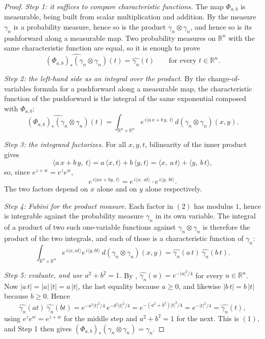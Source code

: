 \begin{proof}
\emph{Step 1: it suffices to compare characteristic functions.}
The map $\Phi_{a,b}$ is measurable, being built from scalar multiplication and
addition.  By  the measure $\gamma_n$ is a probability
measure, hence so is the product $\gamma_n \otimes \gamma_n$, and hence so is its
pushforward along a measurable map.  Two probability measures on $\mathbb{R}^n$
with the same characteristic function are equal, so it is enough to prove
\begin{equation*}
  \widehat{(\Phi_{a,b})_*(\gamma_n \otimes \gamma_n)}(t)
    = \widehat{\gamma_n}(t)
  \qquad\text{for every } t \in \mathbb{R}^n . \tag{1}
\end{equation*}

\emph{Step 2: the left-hand side as an integral over the product.}
By the change-of-variables formula for a pushforward along a measurable map, the
characteristic function of the pushforward is the integral of the same exponential
composed with $\Phi_{a,b}$:
\[
  \widehat{(\Phi_{a,b})_*(\gamma_n \otimes \gamma_n)}(t)
    = \int_{\mathbb{R}^n \times \mathbb{R}^n}
        e^{\,i \langle a\,x + b\,y,\ t\rangle}
      \, d(\gamma_n \otimes \gamma_n)(x,y) .
\]

\emph{Step 3: the integrand factorizes.}
For all $x, y, t$, bilinearity of the inner product gives
\[
  \langle a\,x + b\,y,\ t\rangle
    = a\,\langle x, t\rangle + b\,\langle y, t\rangle
    = \langle x,\ a\,t\rangle + \langle y,\ b\,t\rangle ,
\]
so, since $e^{z+w} = e^z e^w$,
\begin{equation*}
  e^{\,i\langle a x + b y,\ t\rangle}
    = e^{\,i\langle x,\ a t\rangle} \cdot e^{\,i\langle y,\ b t\rangle} . \tag{2}
\end{equation*}
The two factors depend on $x$ alone and on $y$ alone respectively.

\emph{Step 4: Fubini for the product measure.}
Each factor in $(2)$ has modulus $1$, hence is integrable against the probability
measure $\gamma_n$ in its own variable.  The integral of a product of two such
one-variable functions against $\gamma_n \otimes \gamma_n$ is therefore the
product of the two integrals, and each of those is a characteristic function of
$\gamma_n$:
\[
  \int_{\mathbb{R}^n\times\mathbb{R}^n} e^{\,i\langle x, a t\rangle}
      e^{\,i\langle y, b t\rangle} \, d(\gamma_n\otimes\gamma_n)(x,y)
  = \widehat{\gamma_n}(a\,t)\ \widehat{\gamma_n}(b\,t) .
\]

\emph{Step 5: evaluate, and use $a^2 + b^2 = 1$.}
By , $\widehat{\gamma_n}(u) = e^{-|u|^2/4}$ for every
$u \in \mathbb{R}^n$.  Now $|a\,t| = |a|\,|t| = a\,|t|$, the last equality because
$a \geq 0$, and likewise $|b\,t| = b\,|t|$ because $b \geq 0$.  Hence
\[
  \widehat{\gamma_n}(a t)\ \widehat{\gamma_n}(b t)
    = e^{-a^2|t|^2/4}\, e^{-b^2|t|^2/4}
    = e^{-(a^2+b^2)|t|^2/4}
    = e^{-|t|^2/4}
    = \widehat{\gamma_n}(t),
\]
using $e^{z}e^{w} = e^{z+w}$ for the middle step and $a^2 + b^2 = 1$ for the next.
This is $(1)$, and Step 1 then gives
$(\Phi_{a,b})_*(\gamma_n \otimes \gamma_n) = \gamma_n$.


\end{proof}
